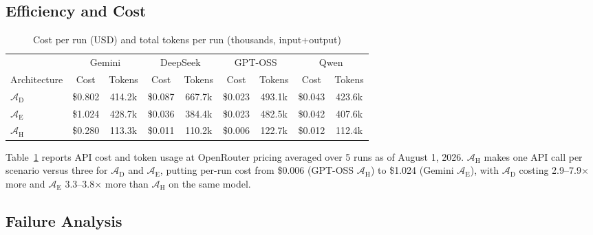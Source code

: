 \documentclass[final,3p,times]{elsarticle}
\begin{document}
\subsection{Efficiency and Cost}
\label{sec:res-efficiency}
\begin{table}[htbp]
\centering
\begin{threeparttable}
\small
\centering
\renewcommand{\arraystretch}{1.15}
\setlength{\tabcolsep}{4pt}
\begin{tabular}{l cc cc cc cc}
\toprule
 & \multicolumn{2}{c}{Gemini} & \multicolumn{2}{c}{DeepSeek} & \multicolumn{2}{c}{GPT-OSS} & \multicolumn{2}{c}{Qwen} \\
\cmidrule(lr){2-3}\cmidrule(lr){4-5}\cmidrule(lr){6-7}\cmidrule(lr){8-9}
Architecture & Cost & Tokens & Cost & Tokens & Cost & Tokens & Cost & Tokens \\
\midrule
$\mathcal{A}_{\text{D}}$ & \$0.802 & 414.2k & \$0.087 & 667.7k & \$0.023 & 493.1k & \$0.043 & 423.6k \\
$\mathcal{A}_{\text{E}}$ & \$1.024 & 428.7k & \$0.036 & 384.4k & \$0.023 & 482.5k & \$0.042 & 407.6k \\
$\mathcal{A}_{\text{H}}$ & \$0.280 & 113.3k & \$0.011 & 110.2k & \$0.006 & 122.7k & \$0.012 & 112.4k \\
\bottomrule
\end{tabular}
\setlength{\tabcolsep}{6pt}
\renewcommand{\arraystretch}{1.0}
\end{threeparttable}
\caption{Cost per run (USD) and total tokens per run (thousands, input+output)}
\label{tab:item8}
\end{table}

Table~\ref{tab:item8} reports API cost and token usage at OpenRouter pricing averaged over 5 runs as of August 1, 2026. $\mathcal{A}_{\text{H}}$ makes one API call per scenario versus three for $\mathcal{A}_{\text{D}}$ and $\mathcal{A}_{\text{E}}$, putting per-run cost from \$0.006 (GPT-OSS $\mathcal{A}_{\text{H}}$) to \$1.024 (Gemini $\mathcal{A}_{\text{E}}$), with $\mathcal{A}_{\text{D}}$ costing 2.9--7.9$\times$ more and $\mathcal{A}_{\text{E}}$ 3.3--3.8$\times$ more than $\mathcal{A}_{\text{H}}$ on the same model.

\FloatBarrier
\subsection{Failure Analysis}
\label{sec:res-failures}
\end{document}
